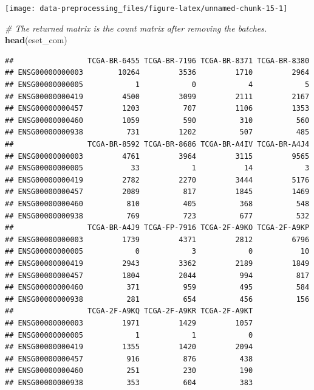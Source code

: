 \documentclass[
  12pt,
]{book}
\newenvironment{Shaded}{\begin{snugshade}}{\end{snugshade}}
\newcommand{\CommentTok}[1]{\textcolor[rgb]{0.56,0.35,0.01}{\textit{#1}}}
\newcommand{\FunctionTok}[1]{\textcolor[rgb]{0.13,0.29,0.53}{\textbf{#1}}}
\newcommand{\NormalTok}[1]{#1}
\begin{document}
\begin{center}\texttt{[image: data-preprocessing\_files/figure-latex/unnamed-chunk-15-1]} \end{center}

\begin{Shaded}
\begin{Highlighting}[]
\CommentTok{\# The returned matrix is the count matrix after removing the batches.}
\FunctionTok{head}\NormalTok{(eset\_com)}
\end{Highlighting}
\end{Shaded}

\begin{verbatim}
##                 TCGA-BR-6455 TCGA-BR-7196 TCGA-BR-8371 TCGA-BR-8380
## ENSG00000000003        10264         3536         1710         2964
## ENSG00000000005            1            0            4            5
## ENSG00000000419         4500         3099         2111         2167
## ENSG00000000457         1203          707         1106         1353
## ENSG00000000460         1059          590          310          560
## ENSG00000000938          731         1202          507          485
##                 TCGA-BR-8592 TCGA-BR-8686 TCGA-BR-A4IV TCGA-BR-A4J4
## ENSG00000000003         4761         3964         3115         9565
## ENSG00000000005           33            1           14            3
## ENSG00000000419         2782         2270         3444         5176
## ENSG00000000457         2089          817         1845         1469
## ENSG00000000460          810          405          368          548
## ENSG00000000938          769          723          677          532
##                 TCGA-BR-A4J9 TCGA-FP-7916 TCGA-2F-A9KO TCGA-2F-A9KP
## ENSG00000000003         1739         4371         2812         6796
## ENSG00000000005            0            3            0           10
## ENSG00000000419         2943         3362         2189         1849
## ENSG00000000457         1804         2044          994          817
## ENSG00000000460          371          959          495          584
## ENSG00000000938          281          654          456          156
##                 TCGA-2F-A9KQ TCGA-2F-A9KR TCGA-2F-A9KT
## ENSG00000000003         1971         1429         1057
## ENSG00000000005            1            1            0
## ENSG00000000419         1355         1420         2094
## ENSG00000000457          916          876          438
## ENSG00000000460          251          230          190
## ENSG00000000938          353          604          383
\end{verbatim}
\end{document}
